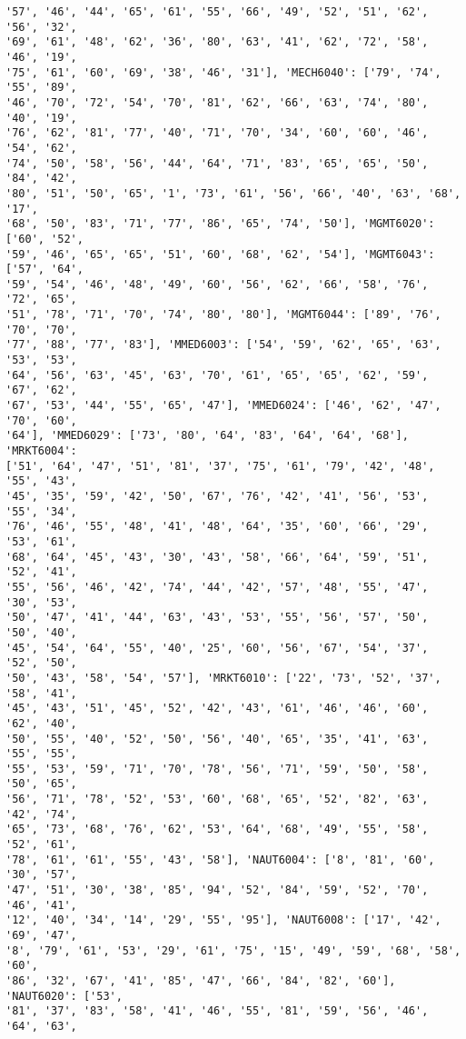 \documentclass[11pt]{article}
\begin{document}
\begin{Verbatim}[commandchars=\\\{\}]
'57', '46', '44', '65', '61', '55', '66', '49', '52', '51', '62', '56', '32',
'69', '61', '48', '62', '36', '80', '63', '41', '62', '72', '58', '46', '19',
'75', '61', '60', '69', '38', '46', '31'], 'MECH6040': ['79', '74', '55', '89',
'46', '70', '72', '54', '70', '81', '62', '66', '63', '74', '80', '40', '19',
'76', '62', '81', '77', '40', '71', '70', '34', '60', '60', '46', '54', '62',
'74', '50', '58', '56', '44', '64', '71', '83', '65', '65', '50', '84', '42',
'80', '51', '50', '65', '1', '73', '61', '56', '66', '40', '63', '68', '17',
'68', '50', '83', '71', '77', '86', '65', '74', '50'], 'MGMT6020': ['60', '52',
'59', '46', '65', '65', '51', '60', '68', '62', '54'], 'MGMT6043': ['57', '64',
'59', '54', '46', '48', '49', '60', '56', '62', '66', '58', '76', '72', '65',
'51', '78', '71', '70', '74', '80', '80'], 'MGMT6044': ['89', '76', '70', '70',
'77', '88', '77', '83'], 'MMED6003': ['54', '59', '62', '65', '63', '53', '53',
'64', '56', '63', '45', '63', '70', '61', '65', '65', '62', '59', '67', '62',
'67', '53', '44', '55', '65', '47'], 'MMED6024': ['46', '62', '47', '70', '60',
'64'], 'MMED6029': ['73', '80', '64', '83', '64', '64', '68'], 'MRKT6004':
['51', '64', '47', '51', '81', '37', '75', '61', '79', '42', '48', '55', '43',
'45', '35', '59', '42', '50', '67', '76', '42', '41', '56', '53', '55', '34',
'76', '46', '55', '48', '41', '48', '64', '35', '60', '66', '29', '53', '61',
'68', '64', '45', '43', '30', '43', '58', '66', '64', '59', '51', '52', '41',
'55', '56', '46', '42', '74', '44', '42', '57', '48', '55', '47', '30', '53',
'50', '47', '41', '44', '63', '43', '53', '55', '56', '57', '50', '50', '40',
'45', '54', '64', '55', '40', '25', '60', '56', '67', '54', '37', '52', '50',
'50', '43', '58', '54', '57'], 'MRKT6010': ['22', '73', '52', '37', '58', '41',
'45', '43', '51', '45', '52', '42', '43', '61', '46', '46', '60', '62', '40',
'50', '55', '40', '52', '50', '56', '40', '65', '35', '41', '63', '55', '55',
'55', '53', '59', '71', '70', '78', '56', '71', '59', '50', '58', '50', '65',
'56', '71', '78', '52', '53', '60', '68', '65', '52', '82', '63', '42', '74',
'65', '73', '68', '76', '62', '53', '64', '68', '49', '55', '58', '52', '61',
'78', '61', '61', '55', '43', '58'], 'NAUT6004': ['8', '81', '60', '30', '57',
'47', '51', '30', '38', '85', '94', '52', '84', '59', '52', '70', '46', '41',
'12', '40', '34', '14', '29', '55', '95'], 'NAUT6008': ['17', '42', '69', '47',
'8', '79', '61', '53', '29', '61', '75', '15', '49', '59', '68', '58', '60',
'86', '32', '67', '41', '85', '47', '66', '84', '82', '60'], 'NAUT6020': ['53',
'81', '37', '83', '58', '41', '46', '55', '81', '59', '56', '46', '64', '63',

\end{Verbatim}
\end{document}
